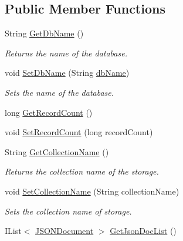 \subsection*{Public Member Functions}
\begin{DoxyCompactItemize}
\item 
String \hyperlink{classcom_1_1shephertz_1_1app42_1_1paas_1_1sdk_1_1csharp_1_1storage_1_1_storage_aab58ec9df7eb104fd21f9bea2f69d88f}{Get\+Db\+Name} ()
\begin{DoxyCompactList}\small\item\em Returns the name of the database. \end{DoxyCompactList}\item 
void \hyperlink{classcom_1_1shephertz_1_1app42_1_1paas_1_1sdk_1_1csharp_1_1storage_1_1_storage_ab33d9199352bc742b765a944082525b9}{Set\+Db\+Name} (String \hyperlink{classcom_1_1shephertz_1_1app42_1_1paas_1_1sdk_1_1csharp_1_1storage_1_1_storage_a55a3b941e53c1a16eac1735e174edd49}{db\+Name})
\begin{DoxyCompactList}\small\item\em Sets the name of the database. \end{DoxyCompactList}\item 
long \hyperlink{classcom_1_1shephertz_1_1app42_1_1paas_1_1sdk_1_1csharp_1_1storage_1_1_storage_aec4d53a6a862e11adb93a2f637d44772}{Get\+Record\+Count} ()
\item 
void \hyperlink{classcom_1_1shephertz_1_1app42_1_1paas_1_1sdk_1_1csharp_1_1storage_1_1_storage_af11241c914b51e4449c9ce753c787a97}{Set\+Record\+Count} (long record\+Count)
\item 
String \hyperlink{classcom_1_1shephertz_1_1app42_1_1paas_1_1sdk_1_1csharp_1_1storage_1_1_storage_af47eee087ad17a6ea8ef80eef23eef54}{Get\+Collection\+Name} ()
\begin{DoxyCompactList}\small\item\em Returns the collection name of the storage. \end{DoxyCompactList}\item 
void \hyperlink{classcom_1_1shephertz_1_1app42_1_1paas_1_1sdk_1_1csharp_1_1storage_1_1_storage_a208db73494e8144e598f2f70fb6af712}{Set\+Collection\+Name} (String collection\+Name)
\begin{DoxyCompactList}\small\item\em Sets the collection name of storage. \end{DoxyCompactList}\item 
I\+List$<$ \hyperlink{classcom_1_1shephertz_1_1app42_1_1paas_1_1sdk_1_1csharp_1_1storage_1_1_storage_1_1_j_s_o_n_document}{J\+S\+O\+N\+Document} $>$ \hyperlink{classcom_1_1shephertz_1_1app42_1_1paas_1_1sdk_1_1csharp_1_1storage_1_1_storage_ad538bda783ccf513d7bc4a5417cb81bc}{Get\+Json\+Doc\+List} ()

\end{DoxyCompactItemize}
